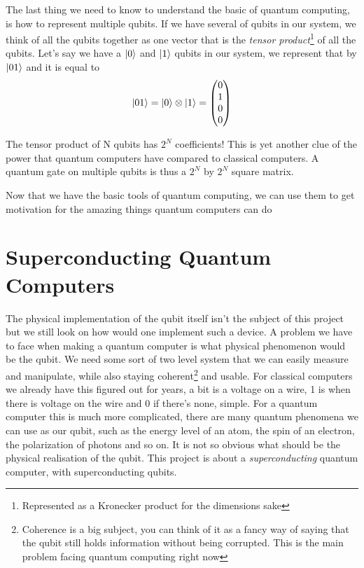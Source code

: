 The last thing we need to know to understand the basic of quantum computing, is how to represent multiple qubits. If we have several of qubits in our system, we think of all the qubits together as one vector that is the \textit{tensor product}\footnote{Represented as a Kronecker product for the dimensions sake} of all the qubits. Let's say we have a $\ket{0}$ and $\ket{1}$ qubits in our system, we represent that by $\ket{01}$ and it is equal to
\[\ket{01} = \ket{0} \otimes \ket{1} =
\begin{pmatrix}
    0 \\
    1 \\
    0 \\
    0
\end{pmatrix}\]

The tensor product of N qubits has $2^N$ coefficients! This is yet another clue of the power that quantum computers have compared to classical computers. A quantum gate on multiple qubits is thus a  $2^N$ by $2^N$ square matrix.

Now that we have the basic tools of quantum computing, we can use them to get motivation for the amazing things quantum computers can do

\section{Superconducting Quantum Computers}
The physical implementation of the qubit itself isn't the subject of this project but we still look on how would one implement such a device. A problem we have to face when making a quantum computer is what physical phenomenon would be the qubit. We need some sort of two level system that we can easily measure and manipulate, while also staying coherent\footnote{Coherence is a big subject, you can think of it as a fancy way of saying that the qubit still holds information without being corrupted. This is the main problem facing quantum computing right now} and usable. For classical computers we already have this figured out for years, a bit is a voltage on a wire, 1 is when there is voltage on the wire and 0 if there's none, simple. For a quantum computer this is much more complicated, there are many quantum phenomena we can use as our qubit, such as the energy level of an atom, the spin of an electron, the polarization of photons and so on. It is not so obvious what should be the physical realisation of the qubit. This project is about a \textit{superconducting} quantum computer, with superconducting  qubits.

